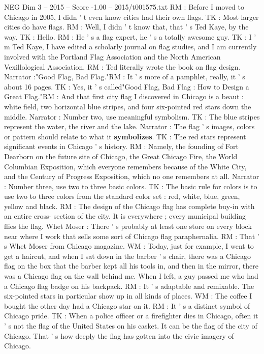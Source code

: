 \begin{textsample}{NEG Dim 3 – 2015 – Score -1.00 – 2015/t001575.txt}
RM : Before I moved to Chicago in 2005, I didn ' t even know cities had their own flags.
TK : Most larger cities do have flags.
RM : Well, I didn ' t know that, that ' s Ted Kaye, by the way.
TK : Hello.
RM : He ' s a flag expert, he ' s a totally awesome guy.
TK : I ' m Ted Kaye, I have edited a scholarly journal on flag studies, and I am currently involved with the Portland Flag Association and the North American Vexillological Association.
RM : Ted literally wrote the book on flag design.
Narrator :"Good Flag, Bad Flag."RM : It ' s more of a pamphlet, really, it ' s about 16 pages.
TK : Yes, it ' s called"Good Flag, Bad Flag : How to Design a Great Flag."RM : And that first city flag I discovered in Chicago is a beaut : white field, two horizontal blue stripes, and four six-pointed red stars down the middle.
Narrator : Number two, use meaningful symbolism.
TK : The blue stripes represent the water, the river and the lake.
Narrator : The flag ' s images, colors or pattern should relate to what it \textbf{symbolizes}.
TK : The red stars represent significant events in Chicago ' s history.
RM : Namely, the founding of Fort Dearborn on the future site of Chicago, the Great Chicago Fire, the World Columbian Exposition, which everyone remembers because of the White City, and the Century of Progress Exposition, which no one remembers at all.
Narrator : Number three, use two to three basic colors.
TK : The basic rule for colors is to use two to three colors from the standard color set : red, white, blue, green, yellow and black.
RM : The design of the Chicago flag has complete buy-in with an entire cross- section of the city.
It is everywhere ; every municipal building flies the flag.
Whet Moser : There ' s probably at least one store on every block near where I work that sells some sort of Chicago flag paraphernalia.
RM : That ' s Whet Moser from Chicago magazine.
WM : Today, just for example, I went to get a haircut, and when I sat down in the barber ' s chair, there was a Chicago flag on the box that the barber kept all his tools in, and then in the mirror, there was a Chicago flag on the wall behind me.
When I left, a guy passed me who had a Chicago flag badge on his backpack.
RM : It ' s adaptable and remixable.
The six-pointed stars in particular show up in all kinds of places.
WM : The coffee I bought the other day had a Chicago star on it.
RM : It ' s a distinct symbol of Chicago pride.
TK : When a police officer or a firefighter dies in Chicago, often it ' s not the flag of the United States on his casket.
It can be the flag of the city of Chicago.
That ' s how deeply the flag has gotten into the civic imagery of Chicago.

\end{textsample}

